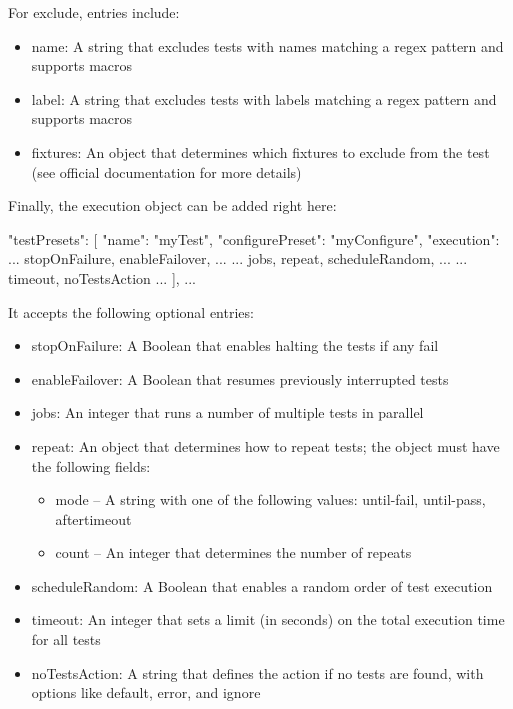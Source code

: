 For exclude, entries include:

\begin{itemize}
\item
name: A string that excludes tests with names matching a regex pattern and supports macros

\item
label: A string that excludes tests with labels matching a regex pattern and supports macros

\item
fixtures: An object that determines which fixtures to exclude from the test (see official documentation for more details)
\end{itemize}

Finally, the execution object can be added right here:

\begin{json}
    "testPresets": [
        {
            "name": "myTest",
            "configurePreset": "myConfigure",
            "execution": {
                ... stopOnFailure, enableFailover, ...
                ... jobs, repeat, scheduleRandom, ...
                ... timeout, noTestsAction ...
            }
        }
    ],
...
\end{json}

It accepts the following optional entries:

\begin{itemize}
\item
stopOnFailure: A Boolean that enables halting the tests if any fail

\item
enableFailover: A Boolean that resumes previously interrupted tests

\item
jobs: An integer that runs a number of multiple tests in parallel

\item
repeat: An object that determines how to repeat tests; the object must have the following fields:
\begin{itemize}
\item
mode – A string with one of the following values: until-fail, until-pass, aftertimeout

\item
count – An integer that determines the number of repeats
\end{itemize}

\item
scheduleRandom: A Boolean that enables a random order of test execution

\item
timeout: An integer that sets a limit (in seconds) on the total execution time for all tests

\item
noTestsAction: A string that defines the action if no tests are found, with options like default, error, and ignore
\end{itemize}

